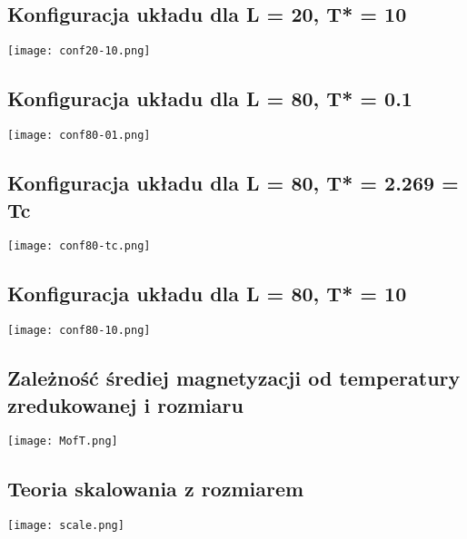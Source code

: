 \documentclass{article}
\begin{document}
\subsection{Konfiguracja układu dla L = 20, T* = 10}
\texttt{[image: conf20-10.png]}

\subsection{Konfiguracja układu dla L = 80, T* = 0.1}
\texttt{[image: conf80-01.png]}
\subsection{Konfiguracja układu dla L = 80, T* = 2.269 = Tc}
\texttt{[image: conf80-tc.png]}
\subsection{Konfiguracja układu dla L = 80, T* = 10}
\texttt{[image: conf80-10.png]}

\subsection{Zależność średiej magnetyzacji od temperatury zredukowanej i rozmiaru}
\texttt{[image: MofT.png]}

\subsection{Teoria skalowania z rozmiarem}
\texttt{[image: scale.png]}
\end{document}
